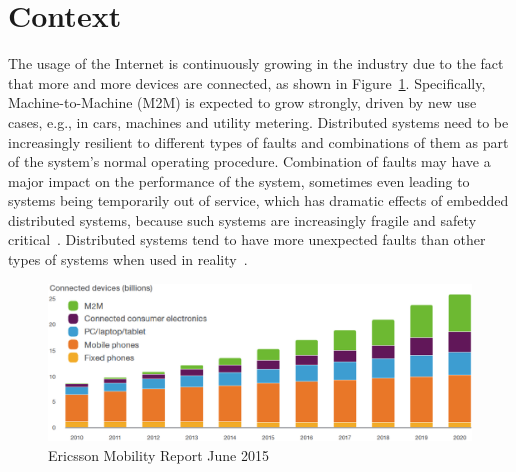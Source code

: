 
\section{Context}\label{sec:context}

The usage of the Internet is continuously growing in the industry due to the fact that more and more devices are connected, as shown in Figure~\ref{ericsson_report}.
Specifically,  Machine-to-Machine (M2M) is expected to grow strongly, driven by new use cases, e.g., in
cars, machines and utility metering.  
Distributed systems need to be increasingly resilient to different types of faults and combinations of them as part of the system's normal operating procedure. Combination of faults may have a major impact on the performance of the system, sometimes even leading to systems being temporarily out of service, which has dramatic effects of embedded distributed systems, because such systems are increasingly fragile and safety critical~\cite{combination}. Distributed systems tend to have more unexpected faults than other types of systems when used in reality~\cite{FaaS}.

\begin{figure}[h]
\centering
\includegraphics[width=\columnwidth]{figure/connected_devices.png}
\caption{Ericsson Mobility Report June 2015 \cite{connected_deveices} \label{ericsson_report}}
\end{figure}


